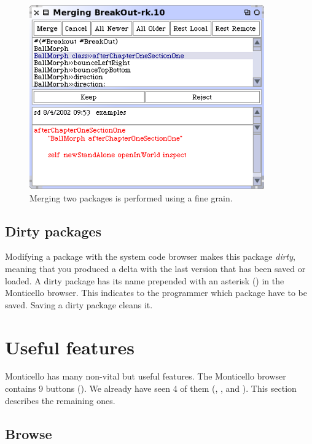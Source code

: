 \documentclass[a4paper,10pt,twoside]{book}
\begin{document}
\begin{figure}[ht]\centering
	\includegraphics[width=.75\linewidth]{merger}
	\caption{Merging two packages is performed using a fine grain.
	}
\end{figure}

\subsection{Dirty packages}

Modifying a package with the system code browser makes this package \emph{dirty}, meaning that you produced a delta with the last version that has been saved or loaded. A dirty package has its name prepended with an asterisk (\ct{*}) in the Monticello browser. This indicates to the programmer which package have to be saved. Saving a dirty package cleans it.

\section{Useful features}

Monticello has many non-vital but useful features. The Monticello browser contains 9 buttons (). We already have seen 4 of them (, ,  and ). This section describes the remaining ones.

\subsection{Browse} 
\end{document}
